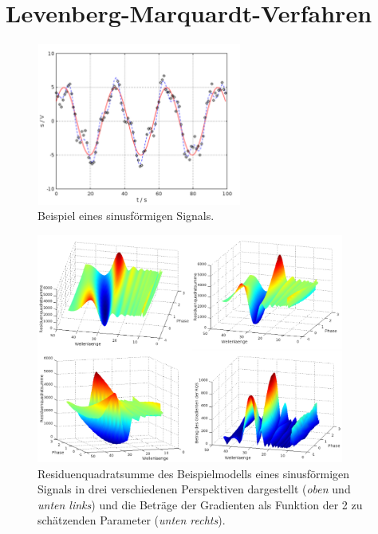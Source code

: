\section{Levenberg-Marquardt-Verfahren}
\begin{figure}
\begin{center}
\includegraphics[width=0.6\textwidth, angle = 0]{03_vorlesung/media/pltSS_nonlin_leastsquare_sin_zB1signal.pdf}
\end{center}
\caption{Beispiel eines sinusförmigen Signals.\label{LSoptiExampleSinus}}
\end{figure}
\begin{figure}
\begin{center}
\includegraphics[width=0.9\textwidth, angle = 0]{03_vorlesung/media/pltSS_nonlin_leastsquare_sin_zB1RQS.pdf}
\end{center}
\caption{Residuenquadratsumme des Beispielmodells eines sinusförmigen Signals
in drei verschiedenen Perspektiven dargestellt (\textsl{oben} und \textsl{unten links})
 und die Beträge der
Gradienten als Funktion der 2 zu schätzenden Parameter (\textsl{unten rechts}).\label{LSoptiExample1SinusRQS}}
\end{figure}
